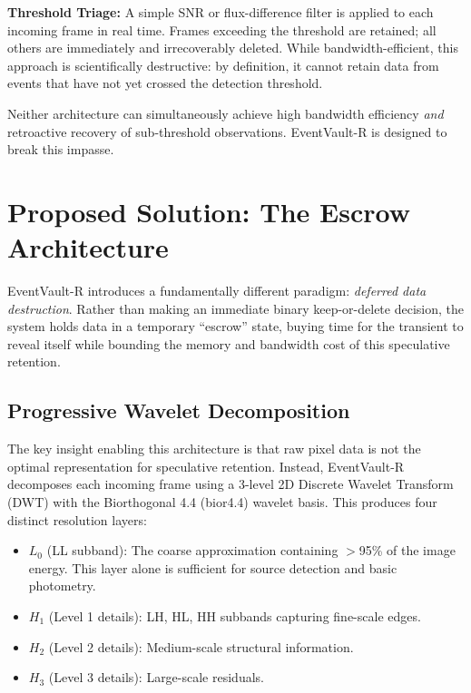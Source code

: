 \documentclass[conference]{IEEEtran}
\begin{document}
\textbf{Threshold Triage:} A simple SNR or flux-difference filter is applied to each incoming frame in real time. Frames exceeding the threshold are retained; all others are immediately and irrecoverably deleted. While bandwidth-efficient, this approach is scientifically destructive: by definition, it cannot retain data from events that have not yet crossed the detection threshold.

Neither architecture can simultaneously achieve high bandwidth efficiency \textit{and} retroactive recovery of sub-threshold observations. EventVault-R is designed to break this impasse.

\section{Proposed Solution: The Escrow Architecture}

EventVault-R introduces a fundamentally different paradigm: \textit{deferred data destruction}. Rather than making an immediate binary keep-or-delete decision, the system holds data in a temporary ``escrow'' state, buying time for the transient to reveal itself while bounding the memory and bandwidth cost of this speculative retention.

\subsection{Progressive Wavelet Decomposition}

The key insight enabling this architecture is that raw pixel data is not the optimal representation for speculative retention. Instead, EventVault-R decomposes each incoming frame using a 3-level 2D Discrete Wavelet Transform (DWT) with the Biorthogonal 4.4 (bior4.4) wavelet basis. This produces four distinct resolution layers:

\begin{itemize}
    \item $L_0$ (LL subband): The coarse approximation containing $>$95\% of the image energy. This layer alone is sufficient for source detection and basic photometry.
    \item $H_1$ (Level 1 details): LH, HL, HH subbands capturing fine-scale edges.
    \item $H_2$ (Level 2 details): Medium-scale structural information.
    \item $H_3$ (Level 3 details): Large-scale residuals.
\end{itemize}
\end{document}
